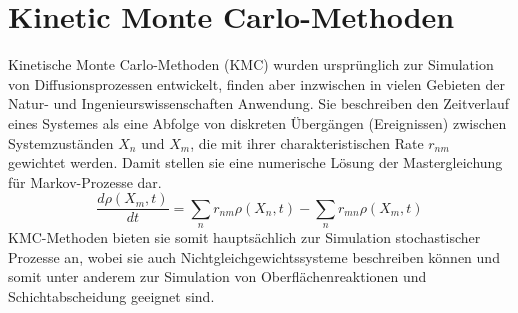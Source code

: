 \section{Kinetic Monte Carlo-Methoden}
\label{kmc}

Kinetische Monte Carlo-Methoden (KMC) wurden ursprünglich zur Simulation von Diffusionsprozessen entwickelt, finden aber inzwischen in vielen Gebieten der Natur- und Ingenieurswissenschaften Anwendung.
Sie beschreiben den Zeitverlauf eines Systemes als eine Abfolge von diskreten Übergängen (Ereignissen) zwischen Systemzuständen $X_n$ und $X_m$, die mit ihrer charakteristischen Rate $r_{n m}$ gewichtet werden.
Damit stellen sie eine numerische Lösung der Mastergleichung für Markov-Prozesse dar.
\begin{equation}
  \frac{d \rho(X_m,t)}{d t} = \sum_n{r_{n m}\rho(X_n,t) - \sum_n{r_{m n}\rho(X_m,t)}}
\end{equation}
KMC-Methoden bieten sie somit hauptsächlich zur Simulation stochastischer Prozesse an, wobei sie auch Nichtgleichgewichtssysteme beschreiben können und somit unter anderem zur Simulation von Oberflächenreaktionen und Schichtabscheidung geeignet sind.

